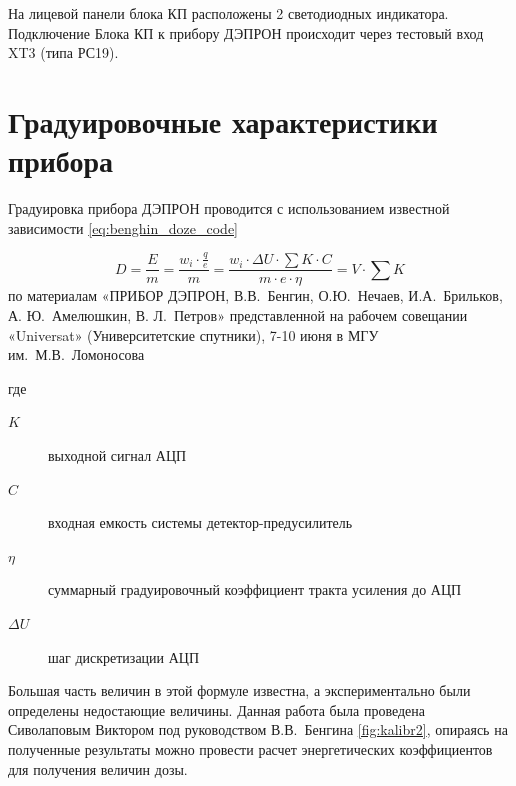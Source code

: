 На лицевой панели блока КП расположены 2 светодиодных индикатора. Подключение Блока КП к прибору ДЭПРОН происходит через тестовый вход XT3 (типа РС19).


\section{Градуировочные характеристики прибора}
Градуировка прибора ДЭПРОН проводится с использованием известной зависимости 
\ref{eq:benghin_doze_code}

\begin{equation}\label{eq:benghin_doze_code}
D = \frac{E}{m} = \dfrac{w_i \cdot\frac{q}{e}}{m} = \frac{w_i \cdot \Delta U \cdot\sum K \cdot C}{m \cdot e \cdot \eta}  = V \cdot \sum K
\end{equation}
по материалам  «ПРИБОР ДЭПРОН, В.В.~Бенгин, О.Ю.~Нечаев, И.А.~Брильков, А. Ю.~Амелюшкин, В. Л.~Петров»  представленной на рабочем совещании «Universat» (Университетские спутники), 7-10 июня в МГУ им.~М.В.~Ломоносова

где \begin{description}	
	\item[$ K $] выходной сигнал АЦП
	\item[$ C $] входная емкость системы детектор-предусилитель
	\item[$ \eta $] суммарный градуировочный коэффициент тракта усиления до АЦП
	\item[$ \Delta U $] шаг дискретизации АЦП
\end{description} 
Большая часть величин в этой формуле известна, а экспериментально были определены недостающие величины. Данная работа была проведена Сиволаповым Виктором под руководством В.В.~Бенгина \ref{fig:kalibr2}, опираясь на полученные результаты можно провести расчет энергетических коэффициентов для получения величин дозы.

